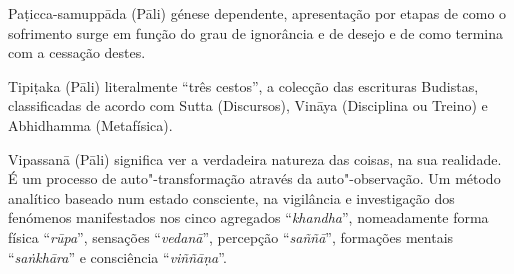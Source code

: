 \begin{glossarydescription}





\item[Paṭicca-samuppāda] (Pāli) génese dependente, apresentação por etapas de
  como o sofrimento surge em função do grau de ignorância e de desejo e de
  como termina com a cessação destes.





\item[Tipiṭaka] (Pāli) literalmente “três cestos”, a colecção das escrituras
  Budistas, classificadas de acordo com Sutta (Discursos), Vināya (Disciplina ou
  Treino) e Abhidhamma (Metafísica).



\item[Vipassanā] (Pāli) significa ver a verdadeira natureza das coisas, na sua
  realidade. É um processo de auto"-transformação através da auto"-observação. Um
  método analítico baseado num estado consciente, na vigilância e investigação dos
  fenómenos manifestados nos cinco agregados “\emph{khandha}”, nomeadamente
  forma física “\emph{rūpa}”, sensações “\emph{vedanā}”,
  percepção “\emph{saññā}”, formações mentais “\emph{saṅkhāra}” e consciência
  “\emph{viññāṇa}”.


\end{glossarydescription}

